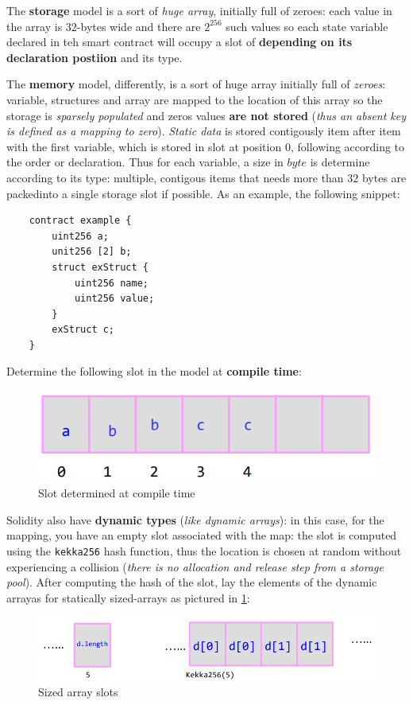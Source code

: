 \documentclass[10pt,a4paper]{report}
\begin{document}
The \textbf{storage} model is a sort of \textit{huge array}, initially full of zeroes: each value in the array is $32$-bytes wide and there are $2^{256}$ such values so each state variable declared in teh smart contract will occupy a slot of \textbf{depending on its declaration postiion} and its type.

The \textbf{memory} model, differently, is a sort of huge array initially full of \textit{zeroes}: variable, structures and array are mapped to the location of this array so the storage is \textit{sparsely populated} and zeros values \textbf{are not stored} (\textit{thus an absent key is defined as a mapping to zero}).
\textit{Static data} is stored contigously item after item with the first variable, which is stored in slot at position $0$, following according to the order or declaration. Thus for each variable, a size in $byte$
is determine according to its type: multiple, contigous items that needs more than $32$ bytes are packedinto a single storage slot if possible.
As an example, the following snippet:
\begin{lstlisting}
	contract example { 
		uint256 a; 
		unit256 [2] b; 
		struct exStruct { 
			uint256 name; 
			uint256 value;
		} 
		exStruct c; 
	}
\end{lstlisting}

Determine the following slot in the model at \textbf{compile time}:
\begin{figure}[h]
	\centering
	\includegraphics[scale=0.50]{images/Pasted image 20230424103001.png}
	\caption{Slot determined at compile time}
\end{figure}


Solidity also have \textbf{dynamic types} (\textit{like dynamic arrays}): in this case, for the mapping, you have an empty slot associated with the map: the slot is computed using the \texttt{kekka256} hash function, thus the location is chosen at random without experiencing a collision (\textit{there is no allocation and release step from a storage pool}).
After computing the hash of the slot, lay the elements of the dynamic arrayas for statically sized-arrays as pictured in \ref{sized-array}:
\begin{figure}[h]
	\centering
	\includegraphics[scale=0.50]{images/Pasted image 20230424103242.png}
	\caption{Sized array slots}
	\label{sized-array}
\end{figure}
\end{document}
